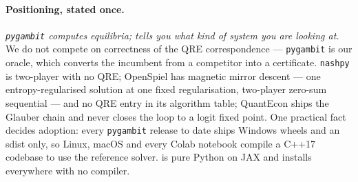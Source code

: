 \paragraph{Positioning, stated once.} \emph{\texttt{pygambit} computes
equilibria; \strataq{} tells you what kind of system you are looking at.} We do
not compete on correctness of the QRE correspondence --- \texttt{pygambit} is our
oracle, which converts the incumbent from a competitor into a certificate.
\texttt{nashpy} \citep{nashpy} is two-player with no QRE; OpenSpiel
\citep{openspiel} has magnetic mirror descent \citep{sokota2023} --- one
entropy-regularised solution at one fixed regularisation, two-player zero-sum
sequential --- and no QRE entry in its algorithm table; QuantEcon ships the
Glauber chain and never closes the loop to a logit fixed point. One practical
fact decides adoption: every \texttt{pygambit} release to date ships Windows
wheels and an sdist only, so Linux, macOS and every Colab notebook compile a
C++17 codebase to use the reference solver. \strataq{} is pure Python on JAX and
installs everywhere with no compiler.
